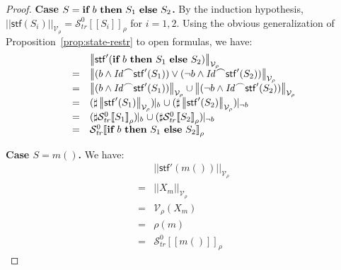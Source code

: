 \documentclass[10pt,a4paper]{amsart}
\theoremstyle{definition}
\newcommand{\denot}[1]{\left[\!\left[#1\right]\!\right]}
\newcommand{\trcdenoth}[1]{\mathcal{S}^0_{\mathit{tr}}\!\denot{#1}}
\newcommand{\logdenotV}[2]{\left|\!\left|#1\right|\!\right|_{#2}}
\newcommand{\chop}[0]{\raisebox{1ex}{$\frown$}}
\newcommand{\stfs}[1]{\mathsf{stf} (#1)}
\newcommand{\stfsh}[1]{\mathsf{stf}' (#1)}
\newcommand{\If}{\mbox{\bf if}}
\newcommand{\Then}{\mbox{\bf then}}
\newcommand{\Else}{\mbox{\bf else}}
\begin{document}
\begin{proof}
\noindent\textbf{Case $S = \If\ b\ \Then\ S_1\ \Else\ S_2$.}
By the induction hypothesis,
$\logdenotV{\stfs{S_i}}{\mathcal{V}_\rho} = \trcdenoth{S_i}_\rho$ for $i=1,2$.
%
Using the obvious generalization of Proposition~\ref{prop:state-restr}
to open formulas, we have:  %
%
\[
\begin{array}{cl}
    & \logdenotV{\stfsh{\If\ b\ \Then\ S_1\ \Else\ S_2}}{\mathcal{V}_\rho} \\
  = & \logdenotV{(b \land \mathit{Id} \chop \stfsh{S_1})
              \lor
              (\lnot b \land \mathit{Id} \chop \stfsh{S_2})}{\mathcal{V}_\rho} \\
  = & \logdenotV{(b \land \mathit{Id} \chop \stfsh{S_1})}{\mathcal{V}_\rho}
      \cup
      \logdenotV{(\lnot b \land \mathit{Id} \chop \stfsh{S_2})}{\mathcal{V}_\rho} \\
  = & (\sharp \logdenotV{\stfsh{S_1}}{\mathcal{V}_\rho}) \!\!\mid_b 
      \cup\>
      (\sharp \logdenotV{\stfsh{S_2}}{\mathcal{V}_\rho}) \!\!\mid_{\neg b}  \\
  = & (\sharp \trcdenoth{S_1}_\rho) \!\!\mid_b 
      \cup\>
      (\sharp \trcdenoth{S_2}_\rho) \!\!\mid_{\neg b}  \\
  = & \trcdenoth{\If\ b\ \Then\ S_1\ \Else\ S_2}_\rho  
\end{array}
\]

\noindent\textbf{Case $S = m()$.}
%
We have:
%
\[
\begin{array}{cl}
    & \logdenotV{\stfsh{m()}}{\mathcal{V}_\rho} \\
  = & \logdenotV{X_m}{\mathcal{V}_\rho}  \\
  = & \mathcal{V}_\rho (X_m)  \\
  = & \rho (m)  \\
  = & \trcdenoth{m()}_\rho  
\end{array}
\]
\end{proof}
\end{document}
